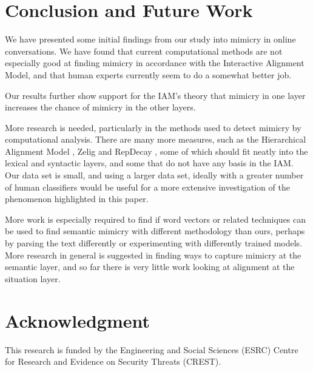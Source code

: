 \documentclass[conference]{IEEEtran}
\begin{document}
\section{Conclusion and Future Work}

We have presented some initial findings from our study into mimicry in online conversations. We have found that current computational methods are not especially good at finding mimicry in accordance with the Interactive Alignment Model, and that human experts currently seem to do a somewhat better job.

Our results further show support for the IAM's theory that mimicry in one layer increases the chance of mimicry in the other layers.

More research is needed, particularly in the methods used to detect mimicry by computational analysis. There are many more measures, such as the Hierarchical Alignment Model \cite{doyle2016robust}, Zelig \cite{jones2014finding} and RepDecay \cite{reitter2006computational}, some of which should fit neatly into the lexical and syntactic layers, and some that do not have any basis in the IAM. Our data set is small, and using a larger data set, ideally with a greater number of human classifiers would be useful for a more extensive investigation of the phenomenon highlighted in this paper.

More work is especially required to find if word vectors or related techniques can be used to find semantic mimicry with different methodology than ours, perhaps by parsing the text differently or experimenting with differently trained models. More research in general is suggested in finding ways to capture mimicry at the semantic layer, and so far there is very little work looking at alignment at the situation layer.


\section*{Acknowledgment}
This research is funded by the Engineering and Social Sciences (ESRC) Centre for Research and Evidence on Security Threats (CREST).

\printbibliography
\end{document}
